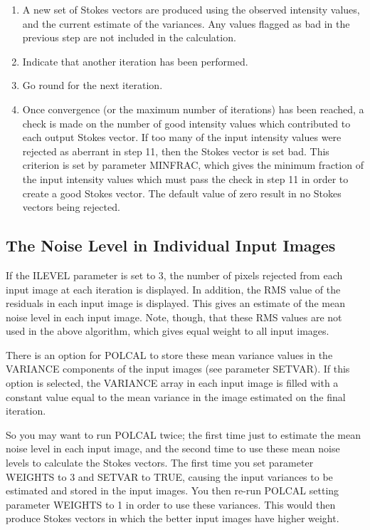 \documentclass[twoside,11pt]{article}
\renewcommand{\_}{\texttt{\symbol{95}}}
\begin{document}
\begin{enumerate}
\item A new set of Stokes vectors are produced using the observed
intensity values, and the current estimate of the variances. Any values
flagged as bad in the previous step are not included in the calculation.

\item Indicate that another iteration has been performed.

\item Go round for the next iteration.

\item Once convergence (or the maximum number of iterations) has been
reached, a check is made on the number of good intensity values which
contributed to each output Stokes vector. If too many of the input
intensity values were rejected as aberrant in step 11, then the Stokes
vector is set bad. This criterion is set by parameter MINFRAC, which
gives the minimum fraction of the input intensity values which must pass
the check in step 11 in order to create a good Stokes vector. The default
value of zero result in no Stokes vectors being rejected.

\end{enumerate}


\subsection{The Noise Level in Individual Input Images}
If the ILEVEL parameter is set to 3, the number of pixels rejected from
each input image at each iteration is displayed. In addition, the RMS
value of the residuals in each input image is displayed. This gives an
estimate of the mean noise level in each input image. Note, though, that 
these RMS values are not used in the above algorithm, which gives equal
weight to all input images. 

There is an option for POLCAL to store these mean variance values in the
VARIANCE components of the input images (see parameter SETVAR). If this
option is selected, the VARIANCE array in each input image is filled with 
a constant value equal to the mean variance in the image estimated on the
final iteration.

So you may want to run POLCAL twice; the first time just to estimate the
mean noise level in each input image, and the second time to use these
mean noise levels to calculate the Stokes vectors. The first time you set
parameter WEIGHTS to 3 and SETVAR to TRUE, causing the input variances to
be estimated and stored in the input images. You then re-run POLCAL
setting parameter WEIGHTS to 1 in order to use these variances. This
would then produce Stokes vectors in which the better input images have
higher weight.
\end{document}
